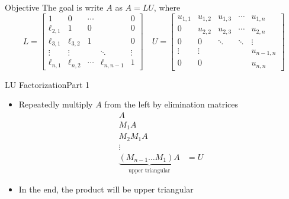 \documentclass[10pt]{beamer}
\begin{document}
\begin{frame}{Objective}
The goal is write $A$ as $A = LU$, where 
\begin{equation*}
    L = \begin{bmatrix}   1       &     0      & \cdots &             & 0 \\
                       \ell_{2,1} &     1      &   0    &             & 0 \\
                       \ell_{3,1} & \ell_{3,2} &   1    &             & 0 \\
                          \vdots  &  \vdots    &        & \ddots      & \vdots  \\
                       \ell_{n,1} & \ell_{n,2} & \cdots & \ell_{n,n-1} & 1
        \end{bmatrix} \quad 
    U = \begin{bmatrix} u_{1,1} & u_{1,2} & u_{1,3} & \cdots & u_{1,n} \\
                          0     & u_{2,2} & u_{2,3} & \cdots & u_{2,n} \\
                          0     &   0     & \ddots  & \ddots & \vdots \\
                         \vdots & \vdots  &         &        & u_{n-1,n} \\
                          0     &   0     &         &        & u_{n,n}
        \end{bmatrix}
\end{equation*}


\end{frame}




\begin{frame}{LU Factorization}{Part 1}
\begin{itemize}
    \item[1.] Repeatedly multiply $A$ from the left by elimination matrices 
        \begin{align*}
         A & \\
         M_1A  &\\
         M_2 M_1A  &\\
                  \vdots  &\\ 
         \underbrace{(M_{n-1} \dots M_1)A}_{\textrm{upper triangular}} & = U
        \end{align*}
    \item[2.] In the end, the product will be upper triangular
\end{itemize}



\end{frame}
\end{document}
